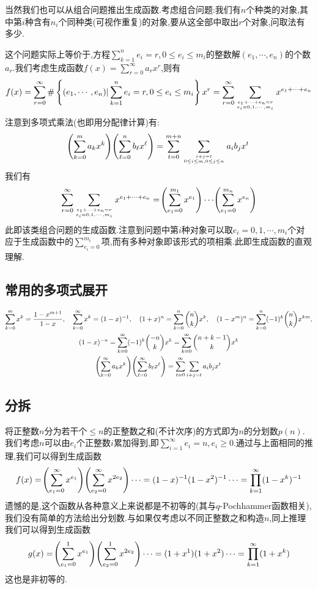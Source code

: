 \documentclass[11pt]{article}
\begin{document}
当然我们也可以从组合问题推出生成函数.考虑组合问题:我们有$n$个种类的对象,其中第$i$种含有$n_i$个同种类(可视作重复)的对象,要从这全部中取出$r$个对象,问取法有多少.

这个问题实际上等价于,方程$\sum_{k=1}^{n}e_i=r, 0\leq e_i\leq m_i$的整数解$(e_1,\cdots,e_n)$的个数$a_r$.我们考虑生成函数$f(x)=\sum_{r=0}^{\infty}a_rx^r$,则有
$$f(x)=\sum_{r=0}^{\infty}\#\left\{(e_1,\cdots,e_n)|\sum_{k=1}^{n}e_i=r, 0\leq e_i\leq m_i\right\}x^r=\sum_{r=0}^{\infty}\sum_{e_1+\cdots+e_n=r\atop e_i=0,1,\cdots,m_i}x^{e_1+\cdots+e_n}$$
注意到多项式乘法(也即用分配律计算)有:
$$\!\left(\sum_{k=0}^{m}a_k x^k\right)\!\left(\sum_{\ell=0}^{n}b_\ell x^\ell\right)=\sum_{t=0}^{m+n} \sum_{i+j=t\atop 0\leq i\leq m, 0\leq j\leq n}a_ib_jx^t$$
我们有
$$\sum_{r=0}^{\infty}\sum_{e_1+\cdots+e_n=r\atop e_i=0,1,\cdots,m_i}x^{e_1+\cdots+e_n}=\!\left(\sum_{e_1=0}^{m_1}x^{e_1}\right)\cdots\!\left(\sum_{e_1=0}^{m_n}x^{e_n}\right)$$
此即该类组合问题的生成函数.注意到问题中第$i$种对象可以取$e_i=0,1,\cdots,m_i$个对应于生成函数中的$\sum_{e_i=0}^{m_i}$项,而有多种对象即该形式的项相乘.此即生成函数的直观理解.

\subsection{常用的多项式展开}
$$\begin{gathered}
    \sum_{k=0}^{m}x^k=\frac{1-x^{m+1}}{1-x},\quad \sum_{k=0}^{\infty}x^k=(1-x)^{-1},\quad (1+x)^n=\sum_{k=0}^{n}\binom{n}{k}x^k,\quad (1-x^m)^{n}=\sum_{k=0}^{n}(-1)^k\binom{n}{k}x^{km},\\
    (1-x)^{-n}=\sum_{k=0}^\infty (-1)^k\binom{-n}{k}x^k=\sum_{k=0}^{\infty}\binom{n+k-1}{k}x^k\\
    \!\left(\sum_{k=0}^{\infty}a_kx^k\right)\!\left(\sum_{\ell=0}^{\infty}b_\ell x^\ell\right)=\sum_{t=0}^{\infty} \sum_{i+j=t}a_ib_j x^t
\end{gathered}$$

\subsection{分拆}
将正整数$n$分为若干个$\leq n$的正整数之和(不计次序)的方式即为$n$的分划数$p(n)$.我们考虑$n$可以由$e_i$个正整数$i$累加得到,即$\sum_{i=1}^\infty e_i=n, e_i\geq 0$.通过与上面相同的推理,我们可以得到生成函数
$$f(x)=\!\left(\sum_{e_1=0}^\infty x^{e_1}\right)\!\left(\sum_{e_2=0}^\infty x^{2e_2}\right)\cdots=(1-x)^{-1}(1-x^2)^{-1}\cdots=\prod_{k=1}^\infty (1-x^k)^{-1}$$
遗憾的是,这个函数从各种意义上来说都是不初等的(其与$q$-Pochhammer函数相关),我们没有简单的方法给出分划数.与如果仅考虑以不同正整数之和构造$n$,同上推理我们可以得到生成函数
$$g(x)=\!\left(\sum_{e_1=0}^1 x^{e_1}\right)\!\left(\sum_{e_2=0}^1 x^{2e_2}\right)\cdots=(1+x^1)(1+x^2)\cdots=\prod_{k=1}^{\infty}(1+x^k)$$
这也是非初等的.
\end{document}
